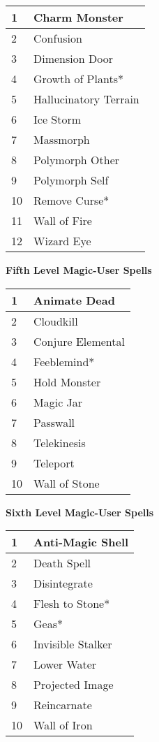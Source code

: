 \documentclass[a4paper,twoside,openany,10pt]{book}
\begin{document}
\begin{multicols}{2}
\begin{tabularx}{0.45\textwidth}{@{}ll@{}}
1 & Charm Monster \\\toprule
2 & Confusion \\\hline
3 & Dimension Door \\\hline
4 & Growth of Plants* \\\hline
5 & Hallucinatory Terrain \\\hline
6 & Ice Storm \\\hline
7 & Massmorph \\\hline
8 & Polymorph Other \\\hline
9 & Polymorph Self \\\hline
10 & Remove Curse* \\\hline
11 & Wall of Fire \\\hline
12 & Wizard Eye \\\bottomrule
\end{tabularx}\bigskip

{\large \textbf{Fifth Level Magic-User Spells}}\\

\begin{tabularx}{0.45\textwidth}{@{}ll@{}}
1 & Animate Dead \\\toprule
2 & Cloudkill \\\hline
3 & Conjure Elemental \\\hline
4 & Feeblemind* \\\hline
5 & Hold Monster \\\hline
6 & Magic Jar \\\hline
7 & Passwall \\\hline
8 & Telekinesis \\\hline
9 & Teleport \\\hline
10 & Wall of Stone \\\bottomrule
\end{tabularx}\bigskip

\textbf{{\large Sixth Level Magic-User Spells}}\\

\begin{tabularx}{0.45\textwidth}{@{}ll@{}}
1 & Anti-Magic Shell \\\toprule
2 & Death Spell \\\hline
3 & Disintegrate \\\hline
4 & Flesh to Stone* \\\hline
5 & Geas* \\\hline
6 & Invisible Stalker \\\hline
7 & Lower Water \\\hline
8 & Projected Image \\\hline
9 & Reincarnate \\\hline
10 & Wall of Iron \\\bottomrule
\end{tabularx}

\end{multicols}
\end{document}
